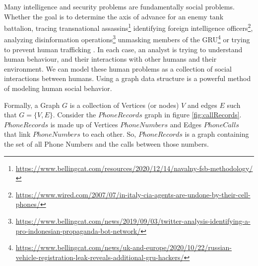 \documentclass[letterpaper, 10pt]{article}
\begin{document}
\begin{multicols}{2}
        \par{Many intelligence and security problems are fundamentally social problems. 
        Whether the goal is to determine the axis of advance for an enemy tank battalion, tracing transnational assassins\footnote{\href{https://www.bellingcat.com/resources/2020/12/14/navalny-fsb-methodology/}{https://www.bellingcat.com/resources/2020/12/14/navalny-fsb-methodology/}} identifying foreign intelligence officers\footnote{\href{https://www.wired.com/2007/07/in-italy-cia-agents-are-undone-by-their-cell-phones/}{https://www.wired.com/2007/07/in-italy-cia-agents-are-undone-by-their-cell-phones/}}, analyzing disinformation operations\footnote{\href{https://www.bellingcat.com/news/2019/09/03/twitter-analysis-identifying-a-pro-indonesian-propaganda-bot-network/}{https://www.bellingcat.com/news/2019/09/03/twitter-analysis-identifying-a-pro-indonesian-propaganda-bot-network/}} unmasking members of the GRU\footnote{\href{https://www.bellingcat.com/news/uk-and-europe/2020/10/22/russian-vehicle-registration-leak-reveals-additional-gru-hackers/}{https://www.bellingcat.com/news/uk-and-europe/2020/10/22/russian-vehicle-registration-leak-reveals-additional-gru-hackers/}} or trying to prevent human trafficking \cite{Szekely2015}. In each case, an analyst is trying to understand human behaviour, and their interactions with other humans and their environment. We can model these human problems as a collection of social interactions between humans. 
        Using a graph data structure is a powerful method of modeling human social behavior.}
        
        \par{Formally, a Graph $G$ is a collection of Vertices (or nodes) $V$ and edges $E$ such that $G=\{V, E\}$.
        Consider the $PhoneRecords$ graph in figure \ref{fig:callRecords}. $PhoneRecords$ is made up of Vertices $PhoneNumbers$ and Edges $PhoneCalls$ that link $PhoneNumbers$ to each other.
        So, $PhoneRecords$ is a graph containing the set of all Phone Numbers and the calls between those numbers.}


\end{multicols}
\end{document}
